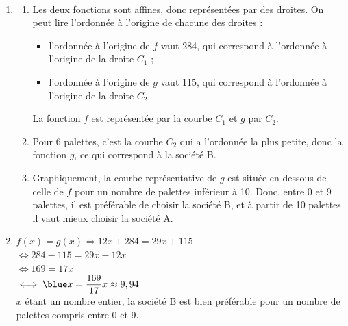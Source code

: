 \begin{corrige}
\ \\ [-5mm]
   \begin{enumerate}
      \item 
         \begin{enumerate}
            \item Les deux fonctions sont affines, donc représentées par des droites. On peut lire l'ordonnée à l'origine de chacune des droites : 
               \begin{itemize}
                  \item l'ordonnée à l'origine de $f$ vaut 284, qui correspond à l'ordonnée à l'origine de la droite $C_1$ ;
                  \item l'ordonnée à l'origine de $g$ vaut 115, qui correspond à l'ordonnée à l'origine de la droite $C_2$.
               \end{itemize}
               {\blue La fonction $f$ est représentée par la courbe $C_1$ et $g$ par $C_2$}.
            \item Pour 6 palettes, c'est la courbe $C_2$ qui a l'ordonnée la plus petite, donc la fonction $g$, ce qui correspond à {\blue la société B}.
            \item Graphiquement, la courbe représentative de $g$ est située en dessous de celle de $f$ pour un nombre de palettes inférieur à 10. Donc, {\blue entre 0 et 9 palettes, il est préférable de choisir la société B, et à partir de 10 palettes il vaut mieux choisir la société A}.   
         \end{enumerate}
      \setcounter{enumi}{1}
      \item $f(x) =g(x) \iff 12x+284 =29x+115$ \\
         \hspace*{2.13cm} $\iff 284-115 =29x-12x$ \\
         \hspace*{2.13cm} $\iff 169 =17x$ \\ [1mm]
         \hspace*{2.13cm} $\iff {\blue x =\dfrac{169}{17}} x \approx9,94$ \\ [1mm]
         $x$ étant un nombre entier, {\blue la société B est bien préférable pour un nombre de palettes compris entre 0 et 9}.
      \end{enumerate}
\end{corrige}

\bigskip


